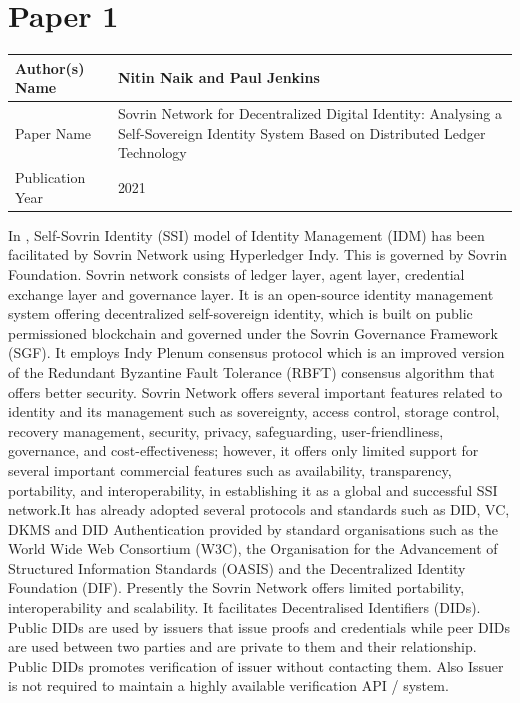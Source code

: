 \section{Paper 1}
    \begin{center}
    \begin{tabular}{ | m{5em} | m{25em} |} 
      \hline
      Author(s) Name & Nitin Naik and Paul Jenkins \\ 
      \hline
      Paper Name & Sovrin Network for Decentralized Digital Identity:
    Analysing a Self-Sovereign Identity System Based
    on Distributed Ledger Technology \\ 
      \hline
      Publication Year & 2021 \\ 
      \hline
    \end{tabular}
    \end{center}
    In \cite{9582551}, Self-Sovrin Identity (SSI) model of Identity Management (IDM) has been facilitated by Sovrin Network using Hyperledger Indy. This is governed by Sovrin Foundation.
    Sovrin network consists of ledger layer, agent layer, credential exchange layer and governance layer. It is an open-source identity management system offering decentralized self-sovereign identity, which is built on public permissioned blockchain and governed under the Sovrin Governance Framework (SGF). It employs Indy Plenum consensus protocol which is an improved version of the Redundant Byzantine Fault Tolerance (RBFT) consensus algorithm that offers better security. Sovrin Network offers several important features related to identity and its management such as sovereignty, access control, storage control, recovery management, security, privacy, safeguarding, user-friendliness, governance, and cost-effectiveness; however, it offers only limited support for several important commercial features such as availability, transparency, portability, and interoperability, in establishing it as a global and successful SSI network.It has already adopted several protocols and standards such as DID, VC, DKMS and DID Authentication provided by standard organisations such as the World Wide Web Consortium (W3C), the Organisation for the Advancement of Structured Information Standards (OASIS) and the Decentralized Identity Foundation (DIF). Presently the Sovrin Network offers limited portability, interoperability and scalability.
    It facilitates Decentralised Identifiers (DIDs). Public DIDs are used by issuers that issue proofs and credentials while peer DIDs are used between two parties and are private to them and their relationship. Public DIDs promotes verification of issuer without contacting them. Also Issuer is not required to maintain a highly available verification API / system.
